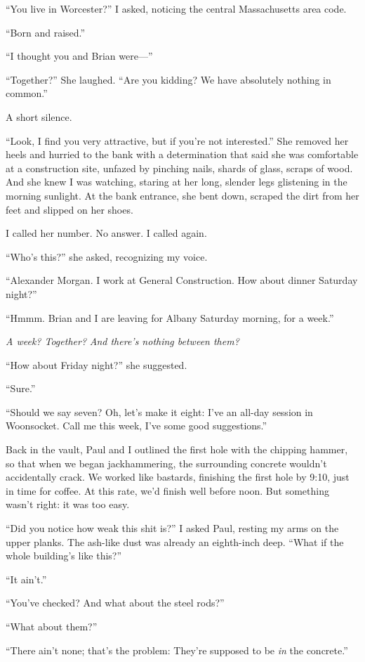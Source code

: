 ``You live in Worcester?'' I asked, noticing the central Massachusetts
area code.

``Born and raised.''

``I thought you and Brian were---''

``Together?'' She laughed. ``Are you kidding? We have absolutely nothing
in common.''

A short silence.

``Look, I find you very attractive, but if you're not interested.'' She
removed her heels and hurried to the bank with a determination that said
she was comfortable at a construction site, unfazed by pinching nails,
shards of glass, scraps of wood. And she knew I was watching, staring at
her long, slender legs glistening in the morning sunlight. At the bank
entrance, she bent down, scraped the dirt from her feet and slipped on
her shoes.

I called her number. No answer. I called again.

``Who's this?'' she asked, recognizing my voice.

``Alexander Morgan. I work at General Construction. How about dinner
Saturday night?''

``Hmmm. Brian and I are leaving for Albany Saturday morning, for a
week.''

\emph{A week? Together?} \emph{And there's nothing between them?}

``How about Friday night?'' she suggested.

``Sure.''

``Should we say seven? Oh, let's make it eight: I've an all-day session
in Woonsocket. Call me this week, I've some good suggestions.''

Back in the vault, Paul and I outlined the first hole with the chipping
hammer, so that when we began jackhammering, the surrounding concrete
wouldn't accidentally crack. We worked like bastards, finishing the
first hole by 9:10, just in time for coffee. At this rate, we'd finish
well before noon. But something wasn't right: it was too easy.

``Did you notice how weak this shit is?'' I asked Paul, resting my arms
on the upper planks. The ash-like dust was already an eighth-inch deep.
``What if the whole building's like this?''

``It ain't.''

``You've checked? And what about the steel rods?''

``What about them?''

``There ain't none; that's the problem: They're supposed to be \emph{in}
the concrete.''


